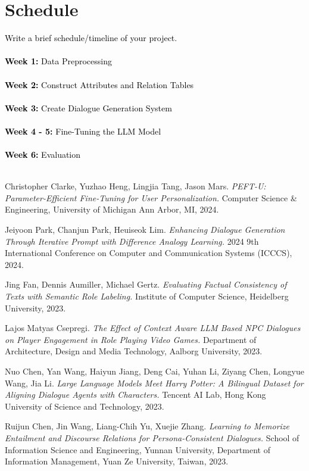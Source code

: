 \documentclass{article}
\begin{document}
\section{Schedule}
\textcolor{black}{Write a brief schedule/timeline of your project.}\\\\
\textcolor{black}{\textbf{Week 1:} Data Preprocessing}\\\\
\textcolor{black}{\textbf{Week 2:} Construct Attributes and Relation Tables}\\\\
\textcolor{black}{\textbf{Week 3:} Create Dialogue Generation System}\\\\
\textcolor{black}{\textbf{Week 4 - 5:} Fine-Tuning the LLM Model}\\\\
\textcolor{black}{\textbf{Week 6:} Evaluation}\\\\


\begin{thebibliography}{9}

Christopher Clarke, Yuzhao Heng, Lingjia Tang, Jason Mars. 
\textit{PEFT-U: Parameter-Efficient Fine-Tuning for User Personalization.} 
Computer Science \& Engineering, University of Michigan Ann Arbor, MI, 2024.

Jeiyoon Park, Chanjun Park, Heuiseok Lim. 
\textit{Enhancing Dialogue Generation Through Iterative Prompt with Difference Analogy Learning.} 
2024 9th International Conference on Computer and Communication Systems (ICCCS), 2024.

Jing Fan, Dennis Aumiller, Michael Gertz. 
\textit{Evaluating Factual Consistency of Texts with Semantic Role Labeling.} 
Institute of Computer Science, Heidelberg University, 2023.

Lajos Matyas Csepregi. 
\textit{The Effect of Context Aware LLM Based NPC Dialogues on Player Engagement in Role Playing Video Games.} 
Department of Architecture, Design and Media Technology, Aalborg University, 2023.

Nuo Chen, Yan Wang, Haiyun Jiang, Deng Cai, Yuhan Li, Ziyang Chen, Longyue Wang, Jia Li. 
\textit{Large Language Models Meet Harry Potter: A Bilingual Dataset for Aligning Dialogue Agents with Characters.} 
Tencent AI Lab, Hong Kong University of Science and Technology, 2023.

Ruijun Chen, Jin Wang, Liang-Chih Yu, Xuejie Zhang. 
\textit{Learning to Memorize Entailment and Discourse Relations for Persona-Consistent Dialogues.} 
School of Information Science and Engineering, Yunnan University, Department of Information Management, Yuan Ze University, Taiwan, 2023.

\end{thebibliography}



\end{document}
